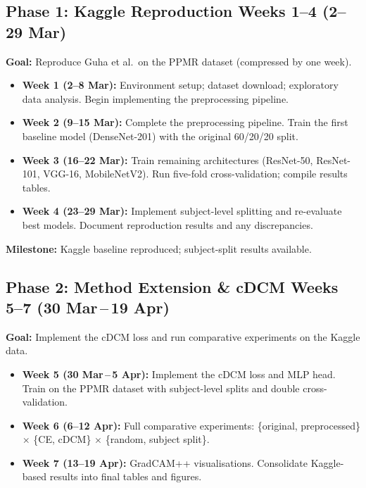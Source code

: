 \documentclass[a4paper,11pt]{article}
\begin{document}
\subsection*{\textcolor{phase1}{Phase 1: Kaggle Reproduction \hfill Weeks 1--4 {\normalfont(2--29 Mar)}}}

\textbf{Goal:} Reproduce Guha et al.\ on the PPMR dataset (compressed by one week).

\begin{itemize}[leftmargin=*]
    \item \textbf{Week 1 (2--8 Mar):}
    Environment setup; dataset download; exploratory data analysis.
    Begin implementing the preprocessing pipeline.

    \item \textbf{Week 2 (9--15 Mar):}
    Complete the preprocessing pipeline.
    Train the first baseline model (DenseNet-201) with the original 60/20/20 split.

    \item \textbf{Week 3 (16--22 Mar):}
    Train remaining architectures (ResNet-50, ResNet-101, VGG-16, MobileNetV2).
    Run five-fold cross-validation; compile results tables.

    \item \textbf{Week 4 (23--29 Mar):}
    Implement subject-level splitting and re-evaluate best models.
    Document reproduction results and any discrepancies.
\end{itemize}

\noindent\textbf{Milestone:} Kaggle baseline reproduced; subject-split results available.

\subsection*{\textcolor{phase2}{Phase 2: Method Extension \& cDCM \hfill Weeks 5--7 {\normalfont(30 Mar\,--\,19 Apr)}}}

\textbf{Goal:} Implement the cDCM loss and run comparative experiments on the Kaggle data.

\begin{itemize}[leftmargin=*]
    \item \textbf{Week 5 (30 Mar\,--\,5 Apr):}
    Implement the cDCM loss and MLP head.
    Train on the PPMR dataset with subject-level splits and double cross-validation.

    \item \textbf{Week 6 (6--12 Apr):}
    Full comparative experiments:
    \{original, preprocessed\} $\times$ \{CE, cDCM\} $\times$ \{random, subject split\}.

    \item \textbf{Week 7 (13--19 Apr):}
    GradCAM++ visualisations.
    Consolidate Kaggle-based results into final tables and figures.
\end{itemize}
\end{document}
